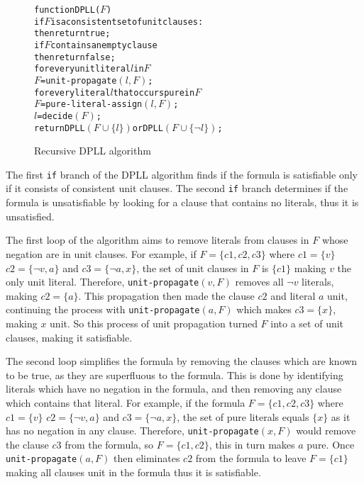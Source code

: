 \begin{figure}[h]
\begin{center}
\begin{alltt}
function DPLL(\(F\))
   if \(F\) is a consistent set of unit clauses:
       then return true;
   if \(F\) contains an empty clause
       then return false;
   for every unit literal \(l\) in \(F\)
      \(F\) = unit-propagate\((l, F)\);
   for every literal \(l\) that occurs pure in \(F\)
      \(F\) = pure-literal-assign\((l, F)\);
   \(l\) = decide\((F)\);
   return DPLL\((F \cup \{l\})\) or DPLL\((F \cup \{\neg l\})\);
  		
\end{alltt}
  \caption{Recursive DPLL algorithm}
  \label{impl.DPLL}
\end{center}
\end{figure}

The first \verb+if+ branch of the DPLL algorithm finds if the formula is satisfiable only if it consists of consistent unit clauses.
The second \verb+if+ branch determines if the formula is unsatisfiable by looking for a clause that contains no literals, thus it is unsatisfied.

The first loop of the algorithm aims to remove literals from clauses in $F$ whose negation are in unit clauses.
For example, if $F = \{c1,c2,c3\}$ where $c1 = \{v\}$ $c2 = \{\neg v, a\}$ and $c3 = \{\neg a , x\}$,
the set of unit clauses in $F$ is $\{c1\}$ making $v$ the only unit literal.
Therefore, \verb+unit-propagate+$(v,F)$ removes all $\neg v$ literals, making $c2 = \{a\}$.
This propagation then made the clause $c2$ and literal $a$ unit, continuing the process with \verb+unit-propagate+$(a,F)$ which makes $c3 = \{x\}$, making $x$ unit.
So this process of unit propagation turned $F$ into a set of unit clauses, making it satisfiable.

The second loop simplifies the formula by removing the clauses which are known to be true, as they are superfluous to the formula.
This is done by identifying literals which have no negation in the formula, and then removing any clause which contains that literal.
For example, if the formula $F = \{c1,c2,c3\}$ where $c1 = \{v\}$ $c2 = \{\neg v, a\}$ and $c3 = \{\neg a , x\}$, 
the set of pure literals equals $\{x\}$ as it has no negation in any clause.
Therefore, \verb+unit-propagate+$(x,F)$ would remove the clause $c3$ from the formula, so $F = \{c1,c2\}$, this in turn makes $a$ pure.
Once \verb+unit-propagate+$(a,F)$ then eliminates $c2$ from the formula to leave $F= \{c1\}$ making all clauses unit in the formula thus it is satisfiable.

